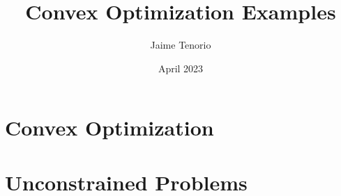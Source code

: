 \documentclass{article}
\title{Convex Optimization Examples}
\author{Jaime Tenorio}
\date{April 2023}
\begin{document}
\maketitle

\section{Convex Optimization}




\section{Unconstrained Problems}


\end{document}
